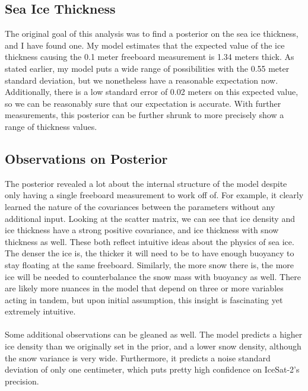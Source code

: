 \documentclass[12pt, letterpaper]{article}
\begin{document}
\subsection{Sea Ice Thickness}
The original goal of this analysis was to find a posterior on the sea ice thickness, and I have found one. My model estimates that
the expected value of the ice thickness causing the 0.1 meter freeboard measurement is 1.34 meters thick. As stated earlier,
my model puts a wide range of possibilities with the 0.55 meter standard deviation, but we nonetheless have a reasonable expectation now.
Additionally, there is a low standard error of 0.02 meters on this expected value, so we can be reasonably sure that our expectation
is accurate. With further measurements, this posterior can be further shrunk to more precisely show a range of thickness values.

\subsection{Observations on Posterior}
The posterior revealed a lot about the internal structure of the model despite only having a single freeboard measurement to work off of.
For example, it clearly learned the nature of the covariances between the parameters without any additional input. Looking at the
scatter matrix, we can see that ice density and ice thickness have a strong positive covariance, and ice thickness with snow thickness as well.
These both reflect intuitive ideas about the physics of sea ice. The denser the ice is, the thicker it will need to be to have enough buoyancy
to stay floating at the same freeboard. Similarly, the more snow there is, the more ice will be needed to counterbalance the snow mass with
buoyancy as well. There are likely more nuances in the model that depend on three or more variables acting in tandem, but upon
initial assumption, this insight is fascinating yet extremely intuitive.
\\\\
Some additional observations can be gleaned as well. The model predicts a higher ice density than we originally set in the prior,
and a lower snow density, although the snow variance is very wide. Furthermore, it predicts a noise standard deviation of only one centimeter,
which puts pretty high confidence on IceSat-2's precision.
\end{document}
